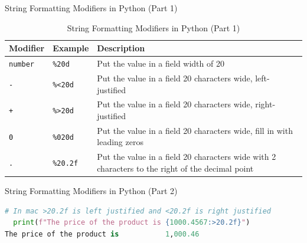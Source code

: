 \begin{frame}{String Formatting Modifiers in Python (Part 1)}
    \begin{table}[]
        \centering
        \begin{tabular}{|l|l|p{6cm}|}
            \hline
            \textbf{Modifier} & \textbf{Example} & \textbf{Description} \\ \hline
            \texttt{number} & \texttt{\%20d} & Put the value in a field width of 20 \\ \hline
            \texttt{-} & \texttt{\%<20d} & Put the value in a field 20 characters wide, left-justified \\ \hline
            \texttt{+} & \texttt{\%>20d} & Put the value in a field 20 characters wide, right-justified \\ \hline
            \texttt{0} & \texttt{\%020d} & Put the value in a field 20 characters wide, fill in with leading zeros \\ \hline
            \texttt{.} & \texttt{\%20.2f} & Put the value in a field 20 characters wide with 2 characters to the right of the decimal point \\ \hline
        \end{tabular}
        \caption{String Formatting Modifiers in Python (Part 1)}
    \end{table}
\end{frame}

\begin{frame}[fragile]{String Formatting Modifiers in Python (Part 2)}
    \begin{lstlisting}[language=Python]
# In mac >20.2f is left justified and <20.2f is right justified
  print(f"The price of the product is {1000.4567:>20.2f}") 
The price of the product is           1,000.46
    \end{lstlisting}
\end{frame}
